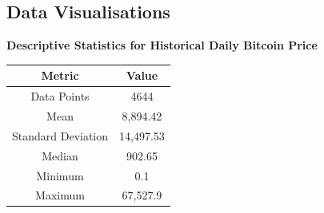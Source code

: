 \documentclass{beamer}
\begin{document}
	\subsection{Data Visualisations}
	\begin{frame}
	\textbf{Descriptive Statistics for Historical Daily Bitcoin Price}
		\begin{tabular}{|c|c|} \hline
			Metric & Value \\ \hline
			Data Points & 4644 \\ 
			Mean & 8,894.42 \\
			Standard Deviation & 14,497.53 \\
			Median & 902.65\\
			Minimum & 0.1\\
			Maximum & 67,527.9\\ \hline
		\end{tabular}
		\end{frame}
	
\end{document}
